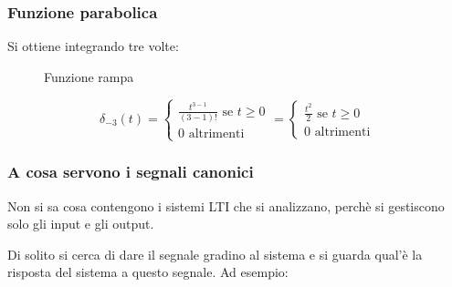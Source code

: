 \documentclass[a4paper]{article}
\begin{document}
\subsubsection{Funzione parabolica}
Si ottiene integrando tre volte:
\begin{figure}[H]
  \centering
  \caption{Funzione rampa}
\end{figure}
\[
  \delta_{-3}(t) = \begin{cases}
    \frac{t^{3-1}}{(3-1)!} \text{ se } t \ge 0\\
    0 \text{ altrimenti}
  \end{cases}
  = \begin{cases}
    \frac{t^2}{2} \text{ se } t \ge 0\\
    0 \text{ altrimenti}
  \end{cases}
\]

\subsubsection{A cosa servono i segnali canonici}
Non si sa cosa contengono i sistemi LTI che si analizzano, perchè si gestiscono
solo gli input e gli output.

\noindent
Di solito si cerca di dare il segnale gradino al sistema e si guarda qual'è la risposta
del sistema a questo segnale. Ad esempio:
\end{document}
